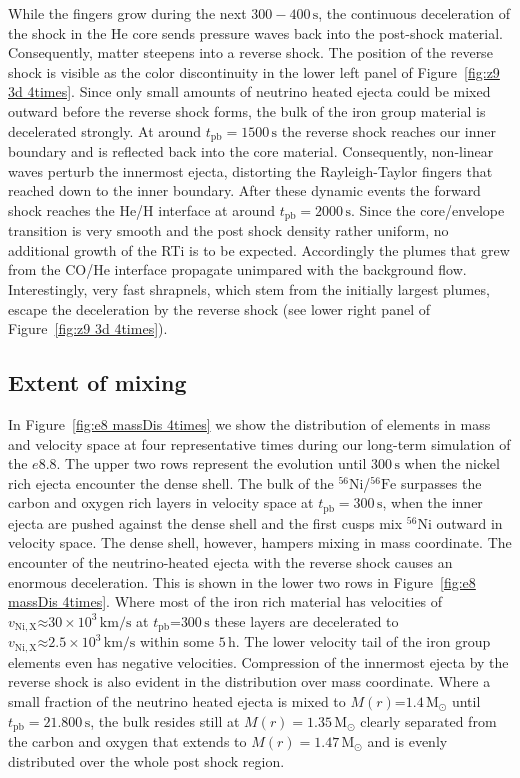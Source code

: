 \documentclass[fleqn,usenatbib]{mnras}
\newcommand{\tpb}{\ensuremath{t_{\text{pb}}}}
\newcommand{\nickel}{\ensuremath{\mathrm{^{56}Ni}}\xspace}
\newcommand{\iron}{\ensuremath{\mathrm{^{56}Fe}}\xspace}
\newcommand{\s}{\ensuremath{\text{s}}}
\begin{document}
While the fingers grow during the next $300-400\,\s$, the continuous deceleration of the shock in the He core sends pressure waves back into the post-shock material. Consequently, matter steepens into a reverse shock. The position of the reverse shock is visible as the color discontinuity in the lower left panel of Figure~\ref{fig:z9 3d 4times}. Since only small amounts of neutrino heated ejecta could be mixed outward before the reverse shock forms, the bulk of the iron group material is decelerated strongly.
At around $\tpb=1500\,\s$ the reverse shock reaches our inner boundary and is reflected back into the core material.
Consequently, non-linear waves perturb the innermost ejecta, distorting the Rayleigh-Taylor fingers that reached down to the inner boundary. 
After these dynamic events the forward shock reaches the He/H interface at around $\tpb=2000\,\text{s}$. Since the core/envelope transition is very smooth and the post shock density rather uniform, no additional growth of the RTi is to be expected. Accordingly the plumes that grew from the CO/He interface propagate unimpared with the background flow. 
Interestingly, very fast shrapnels, which stem from the initially largest plumes, escape the deceleration by the reverse shock (see lower right panel of Figure~\ref{fig:z9 3d 4times}).


\subsection{Extent of mixing}
In Figure~\ref{fig:e8 massDis 4times} we show the distribution of elements in mass and velocity space at four representative times during our long-term simulation of the $e8.8$. The upper two rows represent the evolution until $300\,\text{s}$ when the nickel rich ejecta encounter the dense shell.
The bulk of the \nickel/\iron surpasses the carbon and oxygen rich layers in velocity space at $t_{\mathrm{pb}}=300\,\text{s}$, when the inner ejecta are pushed against the dense shell and the first cusps mix \nickel outward in velocity space. The dense shell, however, hampers mixing in mass coordinate.
The encounter of the neutrino-heated ejecta with the reverse shock causes an enormous deceleration. This is shown in the lower two rows in Figure~\ref{fig:e8 massDis 4times}. Where most of the iron rich material has velocities of $v_{\mathrm{Ni,X}}\mathord{\approx} 30\times10^3 \,\mathrm{km/s}$ at $t_{\mathrm{pb}}\mathord{=}300\,\text{s}$ these layers are decelerated to $v_{\mathrm{Ni,X}}\mathord{\approx} 2.5\times 10^3\,\mathrm{km/s}$ within some $5 \,\mathrm{h}$. The lower velocity tail of the iron group elements even has negative velocities. 
Compression of the innermost ejecta by the reverse shock is also evident in the distribution over mass coordinate. Where a small fraction of the neutrino heated ejecta is mixed to $M(r)\mathord{=}1.4\,\mathrm{M_{\odot}}$ until $t_{\mathrm{pb}}=21.800\,\s$, the bulk resides still at  $M(r)=1.35\,\mathrm{M_{\odot}}$ clearly separated from the carbon and oxygen that extends to $M(r)=1.47\,\mathrm{M_{\odot}}$ and is evenly distributed over the whole post shock region.
\end{document}
